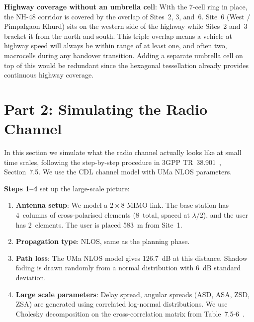 \documentclass[10pt,a4paper,twocolumn]{article}
\begin{document}
\textbf{Highway coverage without an umbrella cell}: With the 7-cell ring in place, the NH-48 corridor is covered by the overlap of Sites~2, 3, and~6. Site~6 (West / Pimpalgaon Khurd) sits on the western side of the highway while Sites~2 and~3 bracket it from the north and south. This triple overlap means a vehicle at highway speed will always be within range of at least one, and often two, macrocells during any handover transition. Adding a separate umbrella cell on top of this would be redundant since the hexagonal tessellation already provides continuous highway coverage.

\begin{table}[H]
\centering
\caption{Cell Type Summary}
\label{tab:cell_types}
%
\end{table}

\section{Part 2: Simulating the Radio Channel}
\label{sec:part2}

In this section we simulate what the radio channel actually looks like at small time scales, following the step-by-step procedure in 3GPP TR~38.901~\cite{3gpp_38901}, Section~7.5. We use the CDL channel model with UMa NLOS parameters.

\textbf{Steps 1--4} set up the large-scale picture:
\begin{enumerate}
\item \textbf{Antenna setup}: We model a $2 \times 8$ MIMO link. The base station has 4~columns of cross-polarised elements (8~total, spaced at $\lambda/2$), and the user has 2~elements. The user is placed 583~m from Site~1.
    \item \textbf{Propagation type}: NLOS, same as the planning phase.
    \item \textbf{Path loss}: The UMa NLOS model gives 126.7~dB at this distance. Shadow fading is drawn randomly from a normal distribution with 6~dB standard deviation.
    \item \textbf{Large scale parameters}: Delay spread, angular spreads (ASD, ASA, ZSD, ZSA) are generated using correlated log-normal distributions. We use Cholesky decomposition on the cross-correlation matrix from Table~7.5-6~\cite{3gpp_38901}.
\end{enumerate}
\end{document}
